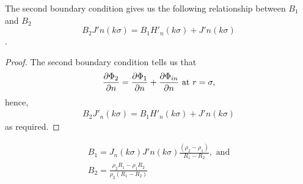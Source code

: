 \begin{propn} The second boundary condition gives us the following relationship between $B_1$ and $B_2$
  \[ B_2 J'n(k\sigma) = B_1 H'_n(k\sigma) + J'n(k\sigma)\].
\end{propn}
\begin{proof}
  The second boundary condition tells us that
  \begin{equation*}
    \frac{\partial \Phi_2}{\partial n} = \frac{\partial \Phi_1}{\partial n} + \frac{\partial \Phi_{in}}{\partial n}  \text{ at } r=\sigma,
  \end{equation*}
  hence,
  \begin{align*}
    B_2J'_n(k\sigma) = B_1 H'_n(k\sigma) + J'n(k\sigma)
  \end{align*}
  as required.
\end{proof}

\begin{propn}
  \begin{gather*}
    B_1 = J_n (k\sigma)J'n(k\sigma)\frac{(\rho_2-\rho_1)}{R_1 - R_2}, \text{ and}\\
    B_2 = \frac{\rho_2R_1- \rho_1 R_2}{\rho_2(R_1 - R_2)}
  \end{gather*}
\end{propn}
